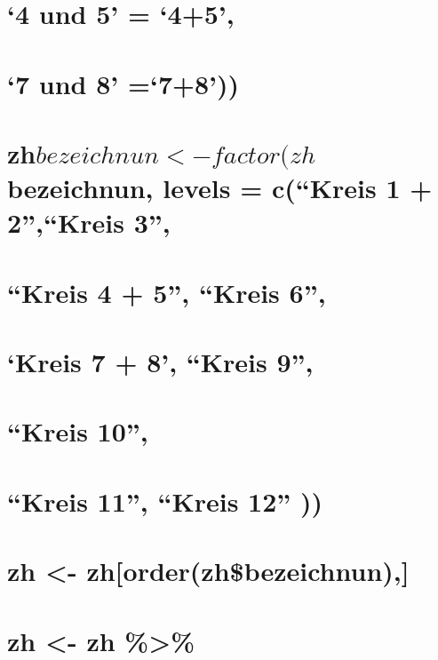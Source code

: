 \documentclass[
]{article}
\begin{document}
\hypertarget{und-5-45}{%
\section{`4 und 5' = `4+5',}\label{und-5-45}}

\hypertarget{und-8-78}{%
\section{`7 und 8' =`7+8'))}\label{und-8-78}}

\hypertarget{zhbezeichnun---factorzhbezeichnun-levels-ckreis-1-2kreis-3}{%
\section{\texorpdfstring{zh\(bezeichnun <- factor(zh\)bezeichnun, levels
= c(``Kreis 1 + 2'',``Kreis
3'',}{zhbezeichnun \textless- factor(zhbezeichnun, levels = c(``Kreis 1 + 2'',``Kreis 3'',}}\label{zhbezeichnun---factorzhbezeichnun-levels-ckreis-1-2kreis-3}}

\hypertarget{kreis-4-5-kreis-6}{%
\section{``Kreis 4 + 5'', ``Kreis 6'',}\label{kreis-4-5-kreis-6}}

\hypertarget{kreis-7-8-kreis-9}{%
\section{`Kreis 7 + 8', ``Kreis 9'',}\label{kreis-7-8-kreis-9}}

\hypertarget{kreis-10}{%
\section{``Kreis 10'',}\label{kreis-10}}

\hypertarget{kreis-11-kreis-12}{%
\section{``Kreis 11'', ``Kreis 12'' ))}\label{kreis-11-kreis-12}}

\hypertarget{zh---zhorderzhbezeichnun}{%
\section{zh \textless-
zh{[}order(zh\$bezeichnun),{]}}\label{zh---zhorderzhbezeichnun}}

\hypertarget{zh---zh-2}{%
\section{zh \textless- zh \%\textgreater\%}\label{zh---zh-2}}
\end{document}
